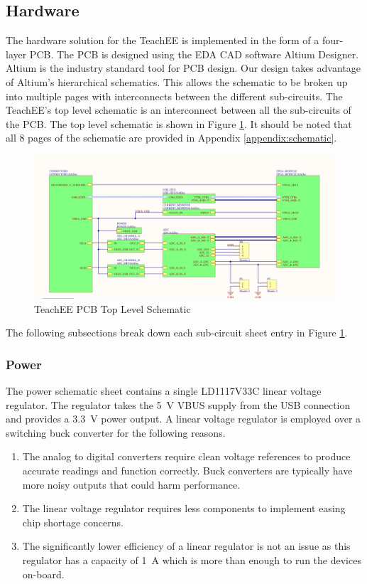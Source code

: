 \documentclass[letterpaper,11pt]{article}
\begin{document}
\subsection{Hardware} %
The hardware solution for the TeachEE is implemented in the form of a four-layer
PCB. The PCB is designed using the EDA CAD software Altium Designer. Altium is
the industry standard tool for PCB design. Our design takes advantage of
Altium's hierarchical schematics. This allows the schematic to be broken up into
multiple pages with interconnects between the different sub-circuits. The
TeachEE's top level schematic is an interconnect between all the sub-circuits of
the PCB. The top level schematic is shown in Figure
\ref{fig:hw-top-level-sheet}. It should be noted that all 8 pages of the
schematic are provided in Appendix \ref{appendix:schematic}.

\begin{figure}[H]
  \centering
  \includegraphics[width=\textwidth]{figures/altium-top-level.png}
  \caption{TeachEE PCB Top Level Schematic}
  \label{fig:hw-top-level-sheet}
\end{figure}

The following subsections break down each sub-circuit sheet entry in Figure
\ref{fig:hw-top-level-sheet}.

\subsubsection{Power}
The power schematic sheet contains a single LD1117V33C linear voltage regulator.
The regulator takes the \SI{5}{\volt} VBUS supply from the USB connection and
provides a \SI{3.3}{\volt} power output. A linear voltage regulator is employed
over a switching buck converter for the following reasons.
  \begin{enumerate}
    \item The analog to digital converters require clean voltage references to
      produce accurate readings and function correctly. Buck converters are
      typically have more noisy outputs that could harm performance.
    \item The linear voltage regulator requires less components to implement
      easing chip shortage concerns.
    \item The significantly lower efficiency of a linear regulator is not an
      issue as this regulator has a capacity of \SI{1}{\ampere} which is more
      than enough to run the devices on-board.
  \end{enumerate}
\end{document}
